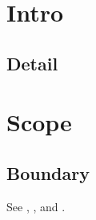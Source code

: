 \section{Intro}\label{sec:intro}
\subsection{Detail}\label{sub:detail}
\section{Scope}\label{sec:scope}
\subsection{Boundary}\label{sub:boundary}
See , , and .
